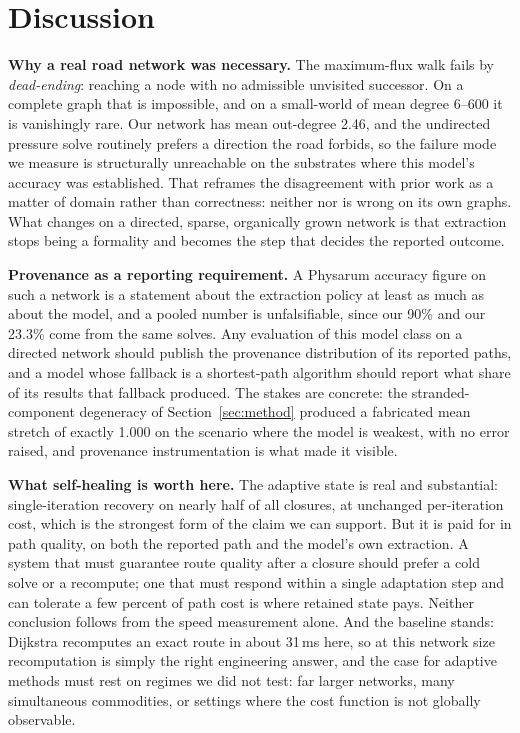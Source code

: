 \section{Discussion}

\textbf{Why a real road network was necessary.} The maximum-flux walk fails
by \emph{dead-ending}: reaching a node with no admissible unvisited
successor. On a complete graph that is impossible, and on a small-world of
mean degree 6--600 it is vanishingly rare. Our network has mean out-degree
2.46, and the undirected pressure solve routinely prefers a direction the
road forbids, so the failure mode we measure is structurally unreachable on
the substrates where this model's accuracy was established. That reframes
the disagreement with prior work as a matter of domain rather than
correctness: neither \cite{zhang2014improved} nor \cite{wang2021transition}
is wrong on its own graphs. What changes on a directed, sparse, organically
grown network is that extraction stops being a formality and becomes the
step that decides the reported outcome.

\textbf{Provenance as a reporting requirement.} A Physarum accuracy figure
on such a network is a statement about the extraction policy at least as
much as about the model, and a pooled number is unfalsifiable, since our
90\% and our 23.3\% come from the same solves. Any evaluation of this model
class on a directed network should publish the provenance distribution of
its reported paths, and a model whose fallback is a shortest-path algorithm
should report what share of its results that fallback produced. The stakes
are concrete: the stranded-component degeneracy of Section~\ref{sec:method}
produced a fabricated mean stretch of exactly 1.000 on the scenario where
the model is weakest, with no error raised, and provenance instrumentation
is what made it visible.

\textbf{What self-healing is worth here.} The adaptive state is real and
substantial: single-iteration recovery on nearly half of all closures, at
unchanged per-iteration cost, which is the strongest form of the claim we
can support. But it is paid for in path quality, on both the reported path
and the model's own extraction. A system that must guarantee route quality
after a closure should prefer a cold solve or a recompute; one that must
respond within a single adaptation step and can tolerate a few percent of
path cost is where retained state pays. Neither conclusion follows from the
speed measurement alone. And the baseline stands: Dijkstra recomputes an
exact route in about 31\,ms here, so at this network size recomputation is
simply the right engineering answer, and the case for adaptive methods must
rest on regimes we did not test: far larger networks, many simultaneous
commodities, or settings where the cost function is not globally observable.

